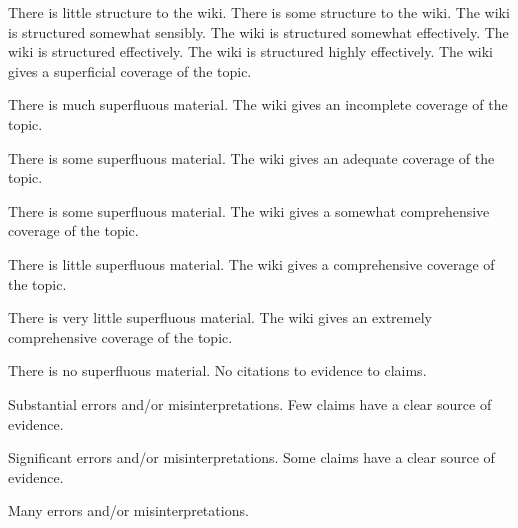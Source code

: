 \documentclass{../../fal_assignment}
\begin{document}
\rubricyearthree
\begin{markingrubric}
%
        \grade\fail 	There is little structure to the wiki.
        \grade 		There is some structure to the wiki.
        \grade 		The wiki is structured somewhat sensibly.
        \grade 		The wiki is structured somewhat effectively.
        \grade 		The wiki is structured effectively.
        \grade 		The wiki is structured highly effectively.
%
        \grade\fail		The wiki gives a superficial coverage of the topic.
				\par			There is much superfluous material.
        \grade 		The wiki gives an incomplete coverage of the topic.
				\par			There is some superfluous material.
        \grade 		The wiki gives an adequate coverage of the topic.
				\par			There is some superfluous material.
        \grade 		The wiki gives a somewhat comprehensive coverage of the topic.
				\par			There is little superfluous material.
        \grade 		The wiki gives a comprehensive coverage of the topic.
				\par			There is very little superfluous material.
        \grade 		The wiki gives an extremely comprehensive coverage of the topic.
				\par			There is no superfluous material.
%
        \grade\fail 	No citations to evidence to claims.
        \par 		Substantial errors and/or misinterpretations.
        \grade 		Few claims have a clear source of evidence.
        \par 		Significant errors and/or misinterpretations.
        \grade 		Some claims have a clear source of evidence.
        \par 		Many errors and/or misinterpretations.

\end{markingrubric}
\end{document}
